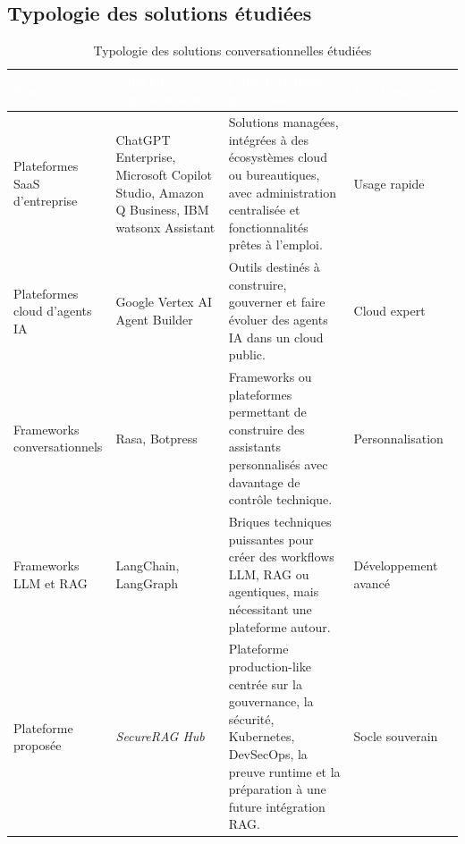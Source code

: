 \subsection{Typologie des solutions étudiées}

\begin{table}[htbp]
\centering
\renewcommand{\arraystretch}{1.35}
\small
\begin{tabularx}{\textwidth}{|p{3.2cm}|Y|Y|p{2.8cm}|}
\hline
{}
\textcolor{white}{\textbf{Famille}} &
\textcolor{white}{\textbf{Solutions représentatives}} &
\textcolor{white}{\textbf{Caractéristiques principales}} &
\textcolor{white}{\textbf{Positionnement}} \\
\hline

Plateformes SaaS d’entreprise &
ChatGPT Enterprise, Microsoft Copilot Studio, Amazon Q Business, IBM watsonx Assistant &
Solutions managées, intégrées à des écosystèmes cloud ou bureautiques, avec administration centralisée et fonctionnalités prêtes à l’emploi. &
Usage rapide \\
\hline

Plateformes cloud d’agents IA &
Google Vertex AI Agent Builder &
Outils destinés à construire, gouverner et faire évoluer des agents IA dans un cloud public. &
Cloud expert \\
\hline

Frameworks conversationnels &
Rasa, Botpress &
Frameworks ou plateformes permettant de construire des assistants personnalisés avec davantage de contrôle technique. &
Personnalisation \\
\hline

Frameworks LLM et RAG &
LangChain, LangGraph &
Briques techniques puissantes pour créer des workflows LLM, RAG ou agentiques, mais nécessitant une plateforme autour. &
Développement avancé \\
\hline

Plateforme proposée &
\textit{SecureRAG Hub} &
Plateforme production-like centrée sur la gouvernance, la sécurité, Kubernetes, DevSecOps, la preuve runtime et la préparation à une future intégration RAG. &
Socle souverain \\
\hline

\end{tabularx}
\caption{Typologie des solutions conversationnelles étudiées}
\label{tab:typologie_solutions_chatbots}
\end{table}

